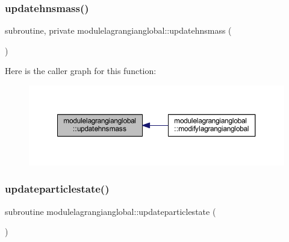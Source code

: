\subsubsection{\texorpdfstring{updatehnsmass()}{updatehnsmass()}}
{\footnotesize\ttfamily subroutine, private modulelagrangianglobal\+::updatehnsmass (\begin{DoxyParamCaption}{ }\end{DoxyParamCaption})\hspace{0.3cm}{\ttfamily [private]}}

Here is the caller graph for this function\+:\nopagebreak
\begin{figure}[H]
\begin{center}
\leavevmode
\includegraphics[width=350pt]{namespacemodulelagrangianglobal_a48c7d753da87150903bd31cb8ff38fb6_icgraph}
\end{center}
\end{figure}
\mbox{\label{namespacemodulelagrangianglobal_ab509b6f03f7bc88920c0f876849e0b4e}} 
\subsubsection{\texorpdfstring{updateparticlestate()}{updateparticlestate()}}
{\footnotesize\ttfamily subroutine modulelagrangianglobal\+::updateparticlestate (\begin{DoxyParamCaption}{ }\end{DoxyParamCaption})\hspace{0.3cm}{\ttfamily [private]}}

